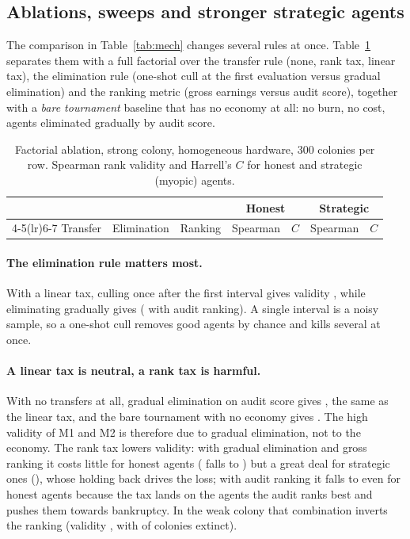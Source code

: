 \documentclass[11pt]{article}
\theoremstyle{plain}
\theoremstyle{remark}
\begin{document}
\subsection{Ablations, sweeps and stronger strategic agents}
\label{sec:ablate}

The comparison in Table~\ref{tab:mech} changes several rules at once. Table~\ref{tab:factorial} separates them with a full factorial over the transfer rule (none, rank tax, linear tax), the elimination rule (one-shot cull at the first evaluation versus gradual elimination) and the ranking metric (gross earnings versus audit score), together with a \emph{bare tournament} baseline that has no economy at all: no burn, no cost, agents eliminated gradually by audit score.

\begin{table}[t]
\centering\small
\caption{Factorial ablation, strong colony, homogeneous hardware, 300 colonies per row. Spearman rank validity and Harrell's $C$ for honest and strategic (myopic) agents.}
\label{tab:factorial}
\begin{tabular}{@{}lllrrrr@{}}
\toprule
 & & & \multicolumn{2}{c}{Honest} & \multicolumn{2}{c}{Strategic} \\
\cmidrule(lr){4-5}\cmidrule(lr){6-7}
Transfer & Elimination & Ranking & Spearman & $C$ & Spearman & $C$ \\
\midrule

\bottomrule
\end{tabular}
\end{table}

\paragraph{The elimination rule matters most.} With a linear tax, culling once after the first interval gives validity \ValLinCullGross{}, while eliminating gradually gives \ValLinGradGross{} (\ValLinGradAudit{} with audit ranking). A single interval is a noisy sample, so a one-shot cull removes good agents by chance and kills several at once.

\paragraph{A linear tax is neutral, a rank tax is harmful.} With no transfers at all, gradual elimination on audit score gives \ValNoneGradAudit{}, the same as the linear tax, and the bare tournament with no economy gives \ValBaseline{}. The high validity of M1 and M2 is therefore due to gradual elimination, not to the economy. The rank tax lowers validity: with gradual elimination and gross ranking it costs little for honest agents (\ValLinGradGross{} falls to \ValRankGradGrossH) but a great deal for strategic ones (\ValRankGradGrossS), whose holding back drives the loss; with audit ranking it falls to \ValRankGradAuditH{} even for honest agents because the tax lands on the agents the audit ranks best and pushes them towards bankruptcy. In the weak colony that combination inverts the ranking (validity \ValWeakRankGradAudit, with \ExtWeakRankGradAudit{} of colonies extinct).
\end{document}

